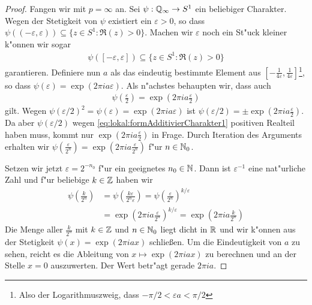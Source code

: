 		\begin{proof}
			Fangen wir mit $p=\infty$ an. Sei $\psi: \mathbb{Q}_\infty \to S^1$ ein beliebiger Charakter.
			Wegen der Stetigkeit von $\psi$ existiert ein $\varepsilon > 0$, so dass $\psi((-\varepsilon, \varepsilon)) \subseteq \{z\in S^1: \Re(z)>0\}$.
			Machen wir $\varepsilon$ noch ein St"uck kleiner k"onnen wir sogar 
			\begin{align}\label{eq:lokal:formAdditivierCharakter1}
				\psi([-\varepsilon, \varepsilon]) \subseteq \{z\in S^1: \Re(z)>0\}
			\end{align}
			garantieren.
			Definiere nun $a$ als das eindeutig bestimmte Element aus $[-\frac{1}{4\varepsilon},\frac{1}{4\varepsilon}]$\footnote{Also der Logarithmuszweig, dass $-\pi/2<\varepsilon a<\pi/2$}, so dass $\psi (\varepsilon) = \exp(2\pi i a \varepsilon)$.
			Als n"achstes behaupten wir, dass auch
			\begin{align*}
				\psi \left(\frac{\varepsilon}{2}\right) =  \exp\left(2\pi i  a \frac{\varepsilon}{2}\right)
			\end{align*}
			gilt.
			Wegen $\psi (\varepsilon/2)^2 = \psi (\varepsilon) = \exp(2\pi i a \varepsilon)$ ist $\psi (\varepsilon/2) = \pm \exp(2\pi i  a \frac{\varepsilon}{2})$.
			Da aber $\psi(\varepsilon/2)$ wegen \eqref{eq:lokal:formAdditivierCharakter1} positiven Realteil haben muss, kommt nur $ \exp(2\pi i  a \frac{\varepsilon}{2})$ in Frage.
			Durch Iteration des Arguments erhalten wir $\psi \left(\frac{\varepsilon}{2^n}\right) = \exp(2\pi i  a \frac{\varepsilon}{2^n})$ f"ur $n\in \mathbb{N}_0$.
			
			Setzen wir jetzt $\varepsilon = 2^{-n_0}$ f"ur ein geeignetes  $n_0\in\mathbb{N}$.
			Dann ist $\varepsilon^{-1}$ eine nat"urliche Zahl und f"ur beliebige $k\in\mathbb{Z}$ haben wir
			\begin{align*}
				\psi \left(\frac{k} {2^{n}}\right) &= \psi \left(\frac{k\varepsilon} {2^{n}\varepsilon}\right) 
										= \psi \left(\frac{\varepsilon} {2^{n}}\right) ^{k/\varepsilon} 
										\\&= \exp\left(2\pi i  a \frac{\varepsilon}{2^n}\right)^{k/\varepsilon}%
										= \exp\left(2\pi i  a \frac{k}{2^n}\right)
			\end{align*}
			Die Menge aller $\frac{k}{2^n}$ mit $k\in \mathbb{Z}$ und $n\in \mathbb{N}_0$ liegt dicht in $\mathbb{R}$ und wir k"onnen aus der Stetigkeit $\psi(x) = \exp(2\pi i a x)$ schließen.
			Um die Eindeutigkeit von $a$ zu sehen, reicht es die Ableitung  von $x \mapsto \exp(2\pi i a x)$ zu berechnen und an der Stelle $x=0$ auszuwerten.
			Der Wert betr"agt gerade $2\pi i a$.
			

\end{proof}
